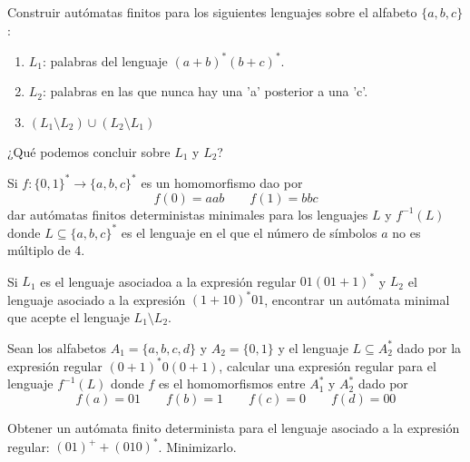 \begin{ejercicio}\label{ej:1.3.26}
    Construir autómatas finitos para los siguientes lenguajes sobre el alfabeto $\{a,b,c\}$:
    \begin{enumerate}
        \item $L_1$: palabras del lenguaje ${(a+b)}^{\ast}{(b+c)}^{\ast}$.
        \item $L_2$: palabras en las que nunca hay una 'a' posterior a una 'c'.
        \item $(L_1 \setminus L_2)\cup (L_2 \setminus L_1)$
    \end{enumerate}
    ¿Qué podemos concluir sobre $L_1$ y $L_2$?
\end{ejercicio}

\begin{ejercicio}\label{ej:1.3.27}
    Si $f:{\{0,1\}}^{\ast}\rightarrow{\{a,b,c\}}^{\ast}$ es un homomorfismo dao por
    \begin{equation*}
        f(0) = aab \qquad f(1) = bbc
    \end{equation*}
    dar autómatas finitos deterministas minimales para los lenguajes $L$ y $f^{-1}(L)$ donde $L\subseteq {\{a,b,c\}}^{\ast}$ es el lenguaje en el que el número de símbolos $a$ no es múltiplo de 4.
\end{ejercicio}

\begin{ejercicio}\label{ej:1.3.28}
    Si $L_1$ es el lenguaje asociadoa a la expresión regular $01{(01+1)}^{\ast}$ y $L_2$ el lenguaje asociado a la expresión ${(1+10)}^{\ast}01$, encontrar un autómata minimal que acepte el lenguaje $L_1\setminus L_2$.
\end{ejercicio}

\begin{ejercicio}\label{ej:1.3.29}
    Sean los alfabetos $A_1=\{a,b,c,d\}$ y $A_2=\{0,1\}$ y el lenguaje $L\subseteq A^\ast_2$ dado por la expresión regular ${(0+1)}^{\ast}0(0+1)$, calcular una expresión regular para el lenguaje $f^{-1}(L)$ donde $f$ es el homomorfismos entre $A^\ast_1$ y $A^\ast_2$ dado por
    \begin{equation*}
        f(a)=01 \qquad f(b) = 1 \qquad f(c)=0 \qquad f(d)=00
    \end{equation*}
\end{ejercicio}

\begin{ejercicio}\label{ej:1.3.30}
    Obtener un autómata finito determinista para el lenguaje asociado a la expresión regular: ${(01)}^{+}+{(010)}^{\ast}$. Minimizarlo.
\end{ejercicio}

